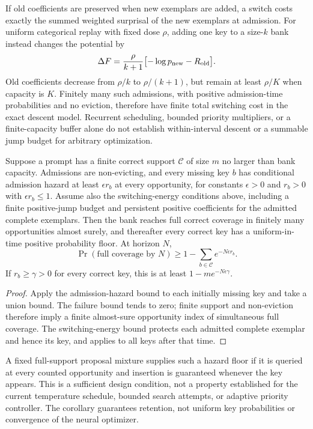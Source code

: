 If old coefficients are preserved when new exemplars are added, a switch
costs exactly the summed weighted surprisal of the new exemplars at admission.
For uniform categorical replay with fixed dose $\rho$, adding one key to a
size-$k$ bank instead changes the potential by
\[
 \Delta F=\frac{\rho}{k+1}
 \bigl[-\log p_{\rm new}-R_{\rm old}\bigr].
\]
Old coefficients decrease from $\rho/k$ to $\rho/(k+1)$, but remain at least
$\rho/K$ when capacity is $K$. Finitely many such admissions, with positive
admission-time probabilities and no eviction, therefore have finite total
switching cost in the exact descent model. Recurrent scheduling, bounded
priority multipliers, or a finite-capacity buffer alone do not establish
within-interval descent or a summable jump budget for arbitrary optimization.


\begin{corollary}
Suppose a prompt has a finite correct support $\mathcal C$ of size $m$ no
larger than bank capacity. Admissions are non-evicting, and every missing key
$b$ has conditional admission hazard at least $\epsilon r_b$ at every
opportunity, for constants $\epsilon>0$ and $r_b>0$ with
$\epsilon r_b\le1$. Assume also the switching-energy conditions above,
including a finite positive-jump budget and persistent positive coefficients
for the admitted complete exemplars. Then the bank reaches full correct
coverage in finitely many opportunities almost surely, and thereafter every correct key has
a uniform-in-time positive probability floor. At horizon $N$,
\[
 \Pr(\text{full coverage by }N)
 \ge 1-\sum_{b\in\mathcal C}e^{-N\epsilon r_b}.
\]
If $r_b\ge\gamma>0$ for every correct key, this is at least
$1-m e^{-N\epsilon\gamma}$.
\end{corollary}
\begin{proof}
Apply the admission-hazard bound to each initially missing key and take a
union bound. The failure bound tends to zero; finite support and non-eviction
therefore imply a finite almost-sure opportunity index of simultaneous full coverage.
The switching-energy bound protects each admitted complete exemplar and hence
its key, and applies to all keys after that time.
\end{proof}

A fixed full-support proposal mixture supplies such a hazard floor if it is
queried at every counted opportunity and insertion is guaranteed whenever the
key appears. This is a sufficient design condition, not a property established
for the current temperature schedule, bounded search attempts, or adaptive
priority controller. The corollary guarantees retention, not uniform key
probabilities or convergence of the neural optimizer.
